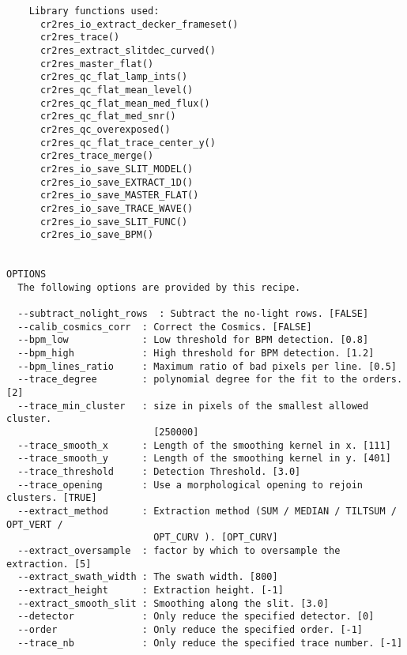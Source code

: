 \begin{verbatim}
    Library functions used:                                               
      cr2res_io_extract_decker_frameset()                                 
      cr2res_trace()                                                      
      cr2res_extract_slitdec_curved()                                     
      cr2res_master_flat()                                                
      cr2res_qc_flat_lamp_ints()                                          
      cr2res_qc_flat_mean_level()                                         
      cr2res_qc_flat_mean_med_flux()                                      
      cr2res_qc_flat_med_snr()                                            
      cr2res_qc_overexposed()                                             
      cr2res_qc_flat_trace_center_y()                                     
      cr2res_trace_merge()                                                
      cr2res_io_save_SLIT_MODEL()                                         
      cr2res_io_save_EXTRACT_1D()                                         
      cr2res_io_save_MASTER_FLAT()                                        
      cr2res_io_save_TRACE_WAVE()                                         
      cr2res_io_save_SLIT_FUNC()                                          
      cr2res_io_save_BPM()                                                
  

OPTIONS
  The following options are provided by this recipe.

  --subtract_nolight_rows  : Subtract the no-light rows. [FALSE]
  --calib_cosmics_corr  : Correct the Cosmics. [FALSE]
  --bpm_low             : Low threshold for BPM detection. [0.8]
  --bpm_high            : High threshold for BPM detection. [1.2]
  --bpm_lines_ratio     : Maximum ratio of bad pixels per line. [0.5]
  --trace_degree        : polynomial degree for the fit to the orders. [2]
  --trace_min_cluster   : size in pixels of the smallest allowed cluster.
                          [250000]
  --trace_smooth_x      : Length of the smoothing kernel in x. [111]
  --trace_smooth_y      : Length of the smoothing kernel in y. [401]
  --trace_threshold     : Detection Threshold. [3.0]
  --trace_opening       : Use a morphological opening to rejoin clusters. [TRUE]
  --extract_method      : Extraction method (SUM / MEDIAN / TILTSUM / OPT_VERT /
                          OPT_CURV ). [OPT_CURV]
  --extract_oversample  : factor by which to oversample the extraction. [5]
  --extract_swath_width : The swath width. [800]
  --extract_height      : Extraction height. [-1]
  --extract_smooth_slit : Smoothing along the slit. [3.0]
  --detector            : Only reduce the specified detector. [0]
  --order               : Only reduce the specified order. [-1]
  --trace_nb            : Only reduce the specified trace number. [-1]

\end{verbatim}
